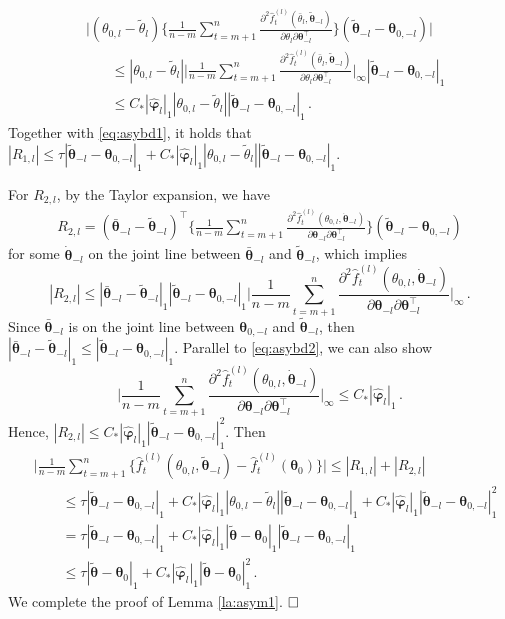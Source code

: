 \documentclass[12pt]{article}
\newcommand{\btheta}{\boldsymbol \theta}
\newcommand{\bvarphi}{\boldsymbol \varphi}
\def\T{{\scriptscriptstyle \top} }
\newcommand{\0}{{\bf 0}}
\begin{document}
\begin{align*}
&\bigg|(\theta_{0,l}-\tilde{\theta}_l)\bigg\{\frac{1}{n-m}\sum_{t=m+1}^n\frac{\partial^2\hat{f}_t^{(l)}(\bar{\theta}_l,\tilde{\btheta}_{-l})}{\partial\theta_l\partial\btheta_{-l}^{\T}}\bigg\}(\tilde{\btheta}_{-l}-\btheta_{0,-l})\bigg|\\
&~~~~~~~~\leq |\theta_{0,l}-\tilde{\theta}_l|\bigg|\frac{1}{n-m}\sum_{t=m+1}^n\frac{\partial^2\hat{f}_t^{(l)}(\bar{\theta}_l,\tilde{\btheta}_{-l})}{\partial\theta_l\partial\btheta_{-l}^{\T}}\bigg|_\infty|\tilde{\btheta}_{-l}-\btheta_{0,-l}|_1\\
&~~~~~~~~\leq C_*|\hat{\bvarphi}_l|_1 |\theta_{0,l}-\tilde{\theta}_l||\tilde{\btheta}_{-l}-\btheta_{0,-l}|_1\,.
\end{align*}
Together with \eqref{eq:asybd1}, it holds that 
$
|R_{1,l}|\leq \tau |\tilde{\btheta}_{-l}-\btheta_{0,-l}|_1+C_*|\hat{\bvarphi}_l|_1 |\theta_{0,l}-\tilde{\theta}_l||\tilde{\btheta}_{-l}-\btheta_{0,-l}|_1$. 

For $R_{2,l}$, by the Taylor expansion, we have
\begin{align*}
R_{2,l}=(\bar{\btheta}_{-l}-\tilde{\btheta}_{-l})^{\T}\bigg\{\frac{1}{n-m}\sum_{t=m+1}^n\frac{\partial^2\hat{f}_t^{(l)}(\theta_{0,l},\dot{\btheta}_{-l})}{\partial\btheta_{-l}\partial\btheta_{-l}^{\T}}\bigg\}(\tilde{\btheta}_{-l}-\btheta_{0,-l})
\end{align*}
for some $\dot{\btheta}_{-l}$ on the joint line between $\bar{\btheta}_{-l}$ and $\tilde{\btheta}_{-l}$, which implies
\[
|R_{2,l}|\leq |\bar{\btheta}_{-l}-\tilde{\btheta}_{-l}|_1|\tilde{\btheta}_{-l}-\btheta_{0,-l}|_1\bigg|\frac{1}{n-m}\sum_{t=m+1}^n\frac{\partial^2\hat{f}_t^{(l)}(\theta_{0,l},\dot{\btheta}_{-l})}{\partial\btheta_{-l}\partial\btheta_{-l}^{\T}}\bigg|_\infty\,.
\]
Since $\bar{\btheta}_{-l}$ is on the joint line between $\btheta_{0,-l}$ and $\tilde{\btheta}_{-l}$, then $|\bar{\btheta}_{-l}-\tilde{\btheta}_{-l}|_1\leq |\tilde{\btheta}_{-l}-\btheta_{0,-l}|_1$. Parallel to \eqref{eq:asybd2}, we can also show
\[
\bigg|\frac{1}{n-m}\sum_{t=m+1}^n\frac{\partial^2\hat{f}_t^{(l)}(\theta_{0,l},\dot{\btheta}_{-l})}{\partial\btheta_{-l}\partial\btheta_{-l}^{\T}}\bigg|_\infty\leq C_*|\hat{\bvarphi}_l|_1\,.
\]
Hence, 
$
|R_{2,l}|\leq C_*|\hat{\bvarphi}_l|_1|\tilde{\btheta}_{-l}-\btheta_{0,-l}|_1^2$. Then
\begin{align*}
&\bigg|\frac{1}{n-m}\sum_{t=m+1}^n\big\{\hat{f}_t^{(l)}(\theta_{0,l},\tilde{\btheta}_{-l})-\hat{f}_t^{(l)}(\btheta_0)\big\}\bigg|\leq |R_{1,l}|+|R_{2,l}|\\
&~~~~~~~~~\leq \tau |\tilde{\btheta}_{-l}-\btheta_{0,-l}|_1+C_*|\hat{\bvarphi}_l|_1 |\theta_{0,l}-\tilde{\theta}_l||\tilde{\btheta}_{-l}-\btheta_{0,-l}|_1+C_*|\hat{\bvarphi}_l|_1|\tilde{\btheta}_{-l}-\btheta_{0,-l}|_1^2\\
&~~~~~~~~~= \tau |\tilde{\btheta}_{-l}-\btheta_{0,-l}|_1+C_*|\hat{\bvarphi}_l|_1 |\tilde{\btheta}-\btheta_{0}|_1|\tilde{\btheta}_{-l}-\btheta_{0,-l}|_1\\
&~~~~~~~~~\leq \tau |\tilde{\btheta}-\btheta_{0}|_1+C_*|\hat{\bvarphi}_l|_1 |\tilde{\btheta}-\btheta_{0}|_1^2\,.
\end{align*}
We complete the proof of Lemma \ref{la:asym1}. $\hfill\Box$
\end{document}
